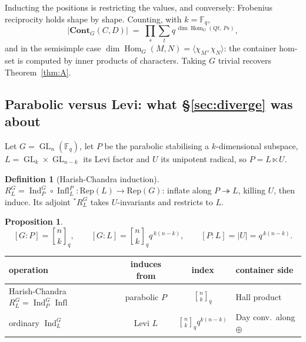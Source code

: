 \documentclass[11pt,a4paper]{article}
\newtheorem{proposition}[theorem]{Proposition}
\theoremstyle{definition}
\newtheorem{definition}[theorem]{Definition}
\theoremstyle{remark}
\newcommand{\FF}{\mathbb{F}}
\newcommand{\cat}[1]{\mathbf{#1}}
\newcommand{\Cont}{\cat{Cont}}
\newcommand{\Rep}{\mathrm{Rep}}
\DeclareMathOperator{\Hom}{Hom}
\DeclareMathOperator{\GL}{GL}
\DeclareMathOperator{\Ind}{Ind}
\DeclareMathOperator{\Infl}{Infl}
\newcommand{\qbin}[2]{\genfrac{[}{]}{0pt}{}{#1}{#2}_{q}}
\begin{document}
Inducting the positions is restricting the values, and conversely: Frobenius
reciprocity holds shape by shape. Counting, with $k = \FF_q$,
\[
  \bigl\lvert\Cont_{G}(C,D)\bigr\rvert
  \;=\; \prod_{s}\sum_{t} q^{\,\dim \Hom_{G}(Q t,\, P s)},
\]
and in the semisimple case $\dim\Hom_G(M,N) = \langle \chi_M, \chi_N\rangle$: the
container hom-set is computed by inner products of characters. Taking $G$ trivial
recovers Theorem~\ref{thm:A}.

\subsection{Parabolic versus Levi: what \S\ref{sec:diverge} was about}

Let $G = \GL_n(\FF_q)$, let $P$ be the parabolic stabilising a $k$-dimensional
subspace, $L = \GL_k \times \GL_{n-k}$ its Levi factor and $U$ its unipotent
radical, so $P = L \ltimes U$.

\begin{definition}[Harish-Chandra induction]
$R_L^G = \Ind_P^G \circ \Infl_L^P : \Rep(L) \to \Rep(G)$: inflate along
$P \twoheadrightarrow L$, killing $U$, then induce. Its adjoint $^{*}R^G_L$ takes
$U$-invariants and restricts to $L$.
\end{definition}

\begin{proposition}\label{prop:parlevi}
\[
  [G:P] = \qbin{n}{k}, \qquad
  [G:L] = \qbin{n}{k} q^{\,k(n-k)}, \qquad
  [P:L] = \lvert U\rvert = q^{\,k(n-k)} .
\]
\end{proposition}

\begin{center}
\small
\setlength{\tabcolsep}{5pt}
\begin{tabular}{lccl}
\toprule
operation & induces from & index & container side \\
\midrule
Harish-Chandra $R_L^G = \Ind_P^G \Infl$ & parabolic $P$ & $\qbin{n}{k}$ & Hall product \\
ordinary $\Ind_L^G$ & Levi $L$ & $\qbin{n}{k}q^{k(n-k)}$ & Day conv.\ along $\oplus$ \\
\bottomrule
\end{tabular}
\end{center}

\begin{center}
\end{center}
\end{document}
